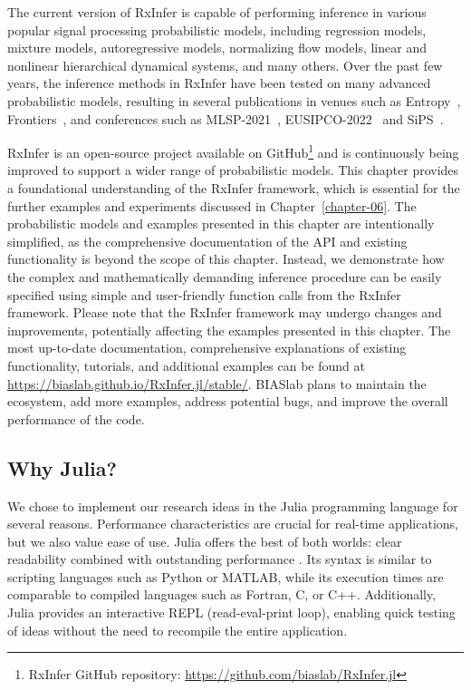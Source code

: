 The current version of RxInfer is capable of performing inference in various popular signal
processing probabilistic models, including regression models, mixture models, autoregressive
models, normalizing flow models, linear and nonlinear hierarchical dynamical systems, and many others.
Over the past few years, the inference methods in RxInfer have been tested on many advanced
probabilistic models, resulting in several publications in venues such as
Entropy~\citep{podusenko_message_2021-1, senoz_variational_2021},
Frontiers~\citep{podusenko_aida_2021}, and conferences such as
MLSP-2021~\citep{podusenko_message_2021}, EUSIPCO-2022~\citep{van_erp_hybrid_2022} and
SiPS~\citep{nguyen_efficient_2022}.

RxInfer is an open-source project available on GitHub\footnote{RxInfer GitHub repository:
  \url{https://github.com/biaslab/RxInfer.jl}} and is continuously being improved to support a wider range of probabilistic models.
This chapter provides a foundational understanding of the RxInfer framework, which is
essential for the further examples and experiments discussed in Chapter~\ref{chapter-06}.
The probabilistic models and examples presented in this chapter are intentionally simplified,
as the comprehensive documentation of the API and existing functionality is beyond the scope
of this chapter.
Instead, we demonstrate how the complex and mathematically demanding inference procedure can
be easily specified using simple and user-friendly function calls from the RxInfer framework.
Please note that the RxInfer framework may undergo changes and improvements, potentially
affecting the examples presented in this chapter.
The most up-to-date documentation, comprehensive explanations of existing functionality, tutorials, and additional examples can be found at
\url{https://biaslab.github.io/RxInfer.jl/stable/}.
BIASlab plans to maintain the ecosystem, add more examples, address potential bugs, and
improve the overall performance of the code.

\subsection*{Why Julia?}

We chose to implement our research ideas in the Julia programming language for several
reasons.
Performance characteristics are crucial for real-time applications, but we also value ease of
use.
Julia offers the best of both worlds: clear readability combined with outstanding performance
\citep{bezanson_julia:_2012, bezanson_julia:_2017}.
Its syntax is similar to scripting languages such as Python or MATLAB, while its execution times
are comparable to compiled languages such as Fortran, C, or C++.
Additionally, Julia provides an interactive REPL (read-eval-print loop), enabling quick
testing of ideas without the need to recompile the entire application.

